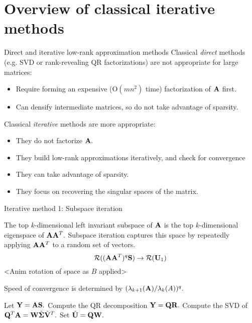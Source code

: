 \documentclass[xcolor={svgnames,pdftex,dvipsnames,table},10pt]{beamer} %
\begin{document}
\section{Overview of classical iterative methods}
\begin{frame}{Direct and iterative low-rank approximation methods}
 Classical \emph{direct} methods (e.g. SVD or rank-revealing QR factorizations) are not appropriate
 for large matrices:
 \begin{itemize}
  \item Require forming an expensive ($\mathrm{O}(mn^2)$ time) factorization of 
  $\mathbf{A}$ first.
  \item Can densify intermediate matrices, so do not take advantage of sparsity.
 \end{itemize}
 
 Classical \emph{iterative} methods are more appropriate:
 \begin{itemize}
  \item They do not factorize $\mathbf{A}.$
  \item They build low-rank approximations iteratively, and check for convergence
  \item They can take advantage of sparsity.
  \item They focus on recovering the singular spaces of the matrix.
 \end{itemize}
\end{frame}

\begin{frame}{Iterative method 1: Subspace iteration}

The top $k$-dimensional left invariant subspace of $\mathbf{A}$ is the top $k$-dimensional eigenspace of $\mathbf{A}\mathbf{A}^T.$
Subspace iteration captures this space by repeatedly applying $\mathbf{A}\mathbf{A}^T$ to
a random set of vectors.
\[
\mathcal{R}((\mathbf{A}\mathbf{A}^T)^q\mathbf{S}) \rightarrow \mathcal{R}(\mathbf{U}_1) 
\]
<Anim rotation of space as $B$ applied>

Speed of convergence is determined by $(\lambda_{k+1}(\mathbf{A})/\lambda_k(A))^q.$
\end{frame}

\begin{frame}
\algrenewcommand{}
 \algrenewcommand{}
 \begin{algorithmic}[1]
  \Statex
  
 \State Let $\mathbf{Y} = \mathbf{A} \mathbf{S}.$
 \State Compute the QR decomposition $\mathbf{Y} = \mathbf{Q} \mathbf{R}.$
 \State Compute the SVD of $\mathbf{Q}^T \mathbf{A} = \mathbf{W} \tilde{\boldsymbol{\Sigma}} \tilde{\mathbf{V}}^T.$
 \State Set $\tilde{\mathbf{U}} = \mathbf{Q} \mathbf{W}.$
\end{algorithmic}

\end{frame}
\end{document}

